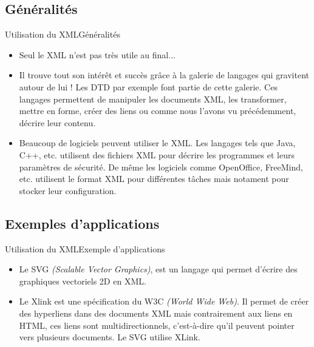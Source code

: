 \documentclass{beamer}
\begin{document}
    \subsection{Généralités}
    \begin{frame}{Utilisation du XML}{Généralités}
        \begin{itemize}
            \item{
               Seul le XML n'est pas très utile au final...
            }
            \item{Il trouve tout son intérêt et succès grâce à la galerie de langages qui gravitent autour de lui ! Les DTD par exemple font partie de cette galerie.
            Ces langages permettent de manipuler les documents XML, les transformer, mettre en forme, créer des liens ou comme nous l'avons vu précédemment, décrire leur contenu.}\pause
            \item 
              Beaucoup de logiciels peuvent utiliser le XML. Les langages tels que Java, C++, etc. utilisent des fichiers XML pour décrire les programmes et leurs paramètres de sécurité. De même les logiciels comme OpenOffice, FreeMind, etc. utilisent le format XML pour différentes tâches mais notament pour stocker leur configuration. 
        \end{itemize}
    \end{frame}
    
    \subsection{Exemples d'applications}
    \begin{frame}{Utilisation du XML}{Exemple d'applications}
        \begin{itemize}
            \item{
            Le SVG \textit{(Scalable Vector Graphics)}, est un langage qui permet d'écrire des graphiques vectoriels 2D en XML.
            }\pause
            \item{Le Xlink est une spécification du W3C \textit{(World Wide Web)}. Il permet de créer des hyperliens dans des documents XML mais contrairement aux liens en HTML, ces liens sont multidirectionnels, c'est-à-dire qu'il peuvent pointer vers plusieurs documents. Le SVG utilise XLink.}
        \end{itemize}
    \end{frame}
    
\end{document}
